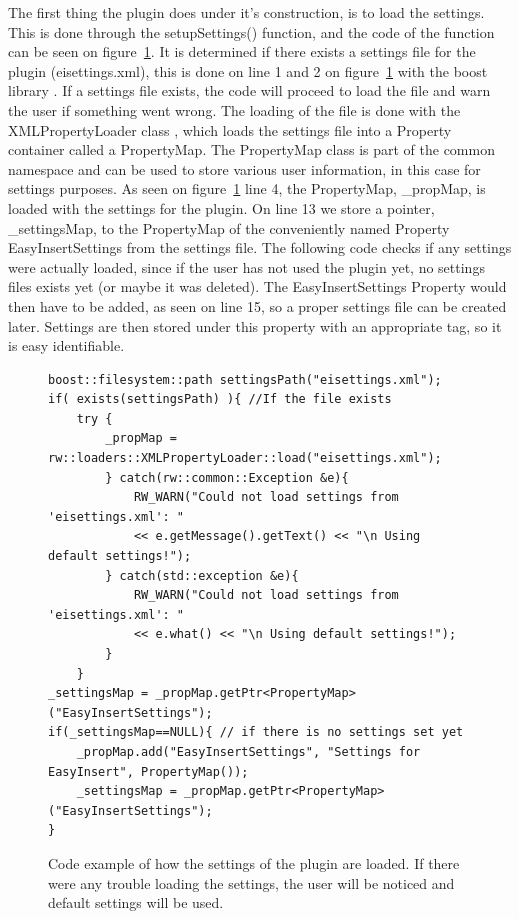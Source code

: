 The first thing the plugin does under it's construction, is to load the settings. This is done through the setupSettings() function, and the code of the function can be seen on figure~\ref{fig:settingsCodeSetup}. It is determined if there exists a settings file for the plugin (eisettings.xml), this is done on line 1 and 2 on figure~\ref{fig:settingsCodeSetup} with the boost library \cite{BoostPathSettings}. If a settings file exists, the code will proceed to load the file and warn the user if something went wrong. The loading of the file is done with the XMLPropertyLoader class \cite{XMLPropertyLoader}, which loads the settings file into a Property container called a PropertyMap. The PropertyMap class is part of the common namespace and can be used to store various user information, in this case for settings purposes. As seen on figure~\ref{fig:settingsCodeSetup} line 4, the PropertyMap, \_propMap, is loaded with the settings for the plugin. On line 13 we store a pointer, \_settingsMap, to the PropertyMap of the conveniently named Property EasyInsertSettings from the settings file. The following code checks if any settings were actually loaded, since if the user has not used the plugin yet, no settings files exists yet (or maybe it was deleted). The EasyInsertSettings Property would then have to be added, as seen on line 15, so a proper settings file can be created later. Settings are then stored under this property with an appropriate tag, so it is easy identifiable.

\begin{figure}[h] %
\centering
\lstset{language=C++} 
\begin{lstlisting}[frame=single]  
boost::filesystem::path settingsPath("eisettings.xml"); 
if( exists(settingsPath) ){ //If the file exists
	try { 
		_propMap = rw::loaders::XMLPropertyLoader::load("eisettings.xml");
		} catch(rw::common::Exception &e){
			RW_WARN("Could not load settings from 'eisettings.xml': " 
			<< e.getMessage().getText() << "\n Using default settings!");
		} catch(std::exception &e){
 			RW_WARN("Could not load settings from 'eisettings.xml': " 
 			<< e.what() << "\n Using default settings!");
		}
	}
_settingsMap = _propMap.getPtr<PropertyMap>("EasyInsertSettings");
if(_settingsMap==NULL){ // if there is no settings set yet
	_propMap.add("EasyInsertSettings", "Settings for EasyInsert", PropertyMap());
	_settingsMap = _propMap.getPtr<PropertyMap>("EasyInsertSettings");
}	 
\end{lstlisting}
\caption{Code example of how the settings of the plugin are loaded. If there were any trouble loading the settings, the user will be noticed and default settings will be used.}
\label{fig:settingsCodeSetup} 	
\end{figure}

